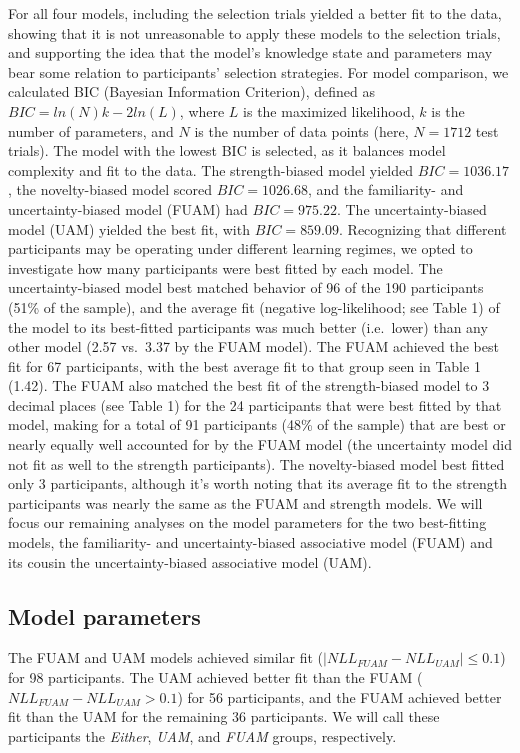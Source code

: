 \documentclass[10pt, letterpaper]{article}
\begin{document}
For all four models, including the selection trials yielded a better fit
to the data, showing that it is not unreasonable to apply these models
to the selection trials, and supporting the idea that the model's
knowledge state and parameters may bear some relation to participants'
selection strategies. For model comparison, we calculated BIC (Bayesian
Information Criterion), defined as \(BIC=ln(N)k-2ln(L)\), where \(L\) is
the maximized likelihood, \(k\) is the number of parameters, and \(N\)
is the number of data points (here, \(N=1712\) test trials). The model
with the lowest BIC is selected, as it balances model complexity and fit
to the data. The strength-biased model yielded \(BIC = 1036.17\), the
novelty-biased model scored \(BIC = 1026.68\), and the familiarity- and
uncertainty-biased model (FUAM) had \(BIC = 975.22\). The
uncertainty-biased model (UAM) yielded the best fit, with
\(BIC = 859.09\). Recognizing that different participants may be
operating under different learning regimes, we opted to investigate how
many participants were best fitted by each model. The uncertainty-biased
model best matched behavior of 96 of the 190 participants (51\% of the
sample), and the average fit (negative log-likelihood; see Table 1) of
the model to its best-fitted participants was much better (i.e.~lower)
than any other model (2.57 vs.~3.37 by the FUAM model). The FUAM
achieved the best fit for 67 participants, with the best average fit to
that group seen in Table 1 (1.42). The FUAM also matched the best fit of
the strength-biased model to 3 decimal places (see Table 1) for the 24
participants that were best fitted by that model, making for a total of
91 participants (48\% of the sample) that are best or nearly equally
well accounted for by the FUAM model (the uncertainty model did not fit
as well to the strength participants). The novelty-biased model best
fitted only 3 participants, although it's worth noting that its average
fit to the strength participants was nearly the same as the FUAM and
strength models. We will focus our remaining analyses on the model
parameters for the two best-fitting models, the familiarity- and
uncertainty-biased associative model (FUAM) and its cousin the
uncertainty-biased associative model (UAM).

\subsection{Model parameters}\label{model-parameters}

The FUAM and UAM models achieved similar fit
(\(|NLL_{FUAM} - NLL_{UAM}| \leq 0.1\)) for 98 participants. The UAM
achieved better fit than the FUAM (\(NLL_{FUAM} - NLL_{UAM} > 0.1\)) for
56 participants, and the FUAM achieved better fit than the UAM for the
remaining 36 participants. We will call these participants the
\emph{Either}, \emph{UAM}, and \emph{FUAM} groups, respectively.
\end{document}
